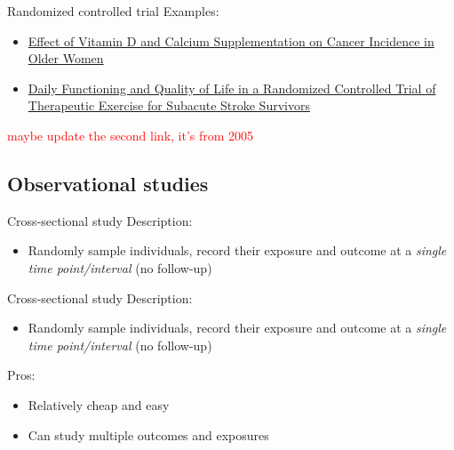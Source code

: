 \documentclass[10pt,t]{beamer}
\begin{document}
\begin{frame}[c]{Randomized controlled trial}
Examples: 

\vspace{0.3cm}

\begin{itemize}
	\item \href{https://jamanetwork.com/journals/jama/article-abstract/2613159}{\color{cyan} Effect of Vitamin D and Calcium Supplementation on Cancer Incidence in Older Women}
	\item \href{http://stroke.ahajournals.org/content/36/8/1764.short}{\color{cyan} Daily Functioning and Quality of Life in a Randomized Controlled Trial of Therapeutic Exercise for Subacute Stroke Survivors}
\end{itemize}
\textcolor{red}{maybe update the second link, it's from 2005} 
\end{frame}


\subsection{Observational studies}

\begin{frame}{Cross-sectional study}
Description:
\begin{itemize}
	\item Randomly sample individuals, record their exposure and outcome at a \textit{single time point/interval} (no follow-up)
\end{itemize}
\end{frame}

\begin{frame}{Cross-sectional study}
Description:
\begin{itemize}
	\item Randomly sample individuals, record their exposure and outcome at a \textit{single time point/interval} (no follow-up)
\end{itemize}
Pros:
\begin{itemize}
	\item Relatively cheap and easy
	\item Can study multiple outcomes and exposures
\end{itemize}
\end{frame}
\end{document}
